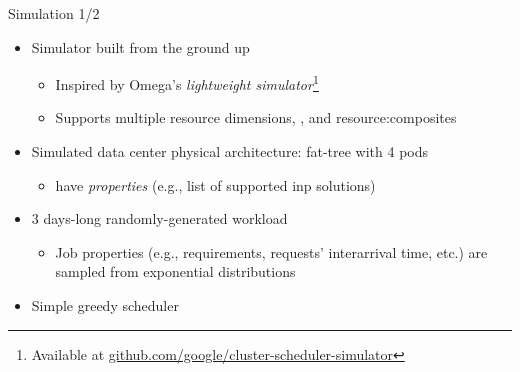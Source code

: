 \begin{frame}{Simulation 1/2}
    \begin{itemize}
        \item Simulator built from the ground up %
        \begin{itemize}
            \item Inspired by Omega's \cite{omega} \textit{lightweight simulator}\footnote[2]{\scriptsize{Available at \href{https://github.com/google/cluster-scheduler-simulator}{github.com/google/cluster-scheduler-simulator}}}
            \item Supports multiple resource dimensions, , and \glspl{resource:composite}
        \end{itemize}
        \item Simulated data center physical architecture: fat-tree with 4 pods
        \begin{itemize}
            \item {} have \textit{properties} (e.g., list of supported \gls*{inp} solutions)
        \end{itemize}
        \item 3 days-long randomly-generated workload
        \begin{itemize}
            \item Job properties (e.g., requirements, requests' interarrival time, etc.) are sampled from exponential distributions %
        \end{itemize}
        \item Simple greedy scheduler
    \end{itemize}
\end{frame}


